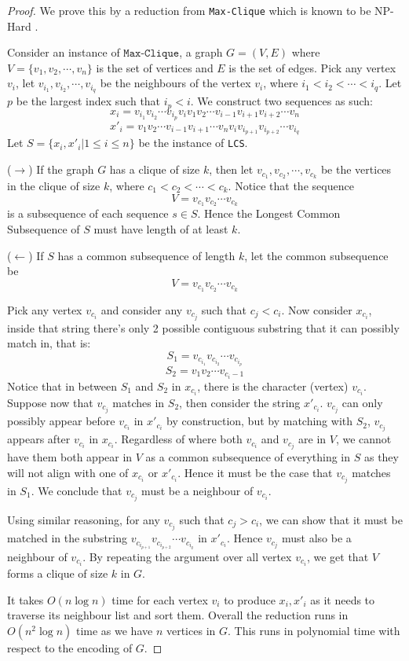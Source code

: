 \begin{proof}
    We prove this by a reduction from \texttt{Max-Clique} which is known to be NP-Hard \cite{MaxClique}.
    
    Consider an instance of $\texttt{Max-Clique}$, a graph $G = (V, E)$ where $V = \{v_1, v_2, \cdots, v_n\}$ is the set of vertices and $E$ is the set of edges. Pick any vertex $v_i$, let $v_{i_1}, v_{i_2}, \cdots, v_{i_q}$ be the neighbours of the vertex $v_i$, where $i_1 < i_2 < \cdots < i_q$. Let $p$ be the largest index such that $i_p < i$. We construct two sequences as such:
    \[x_i = v_{i_1}v_{i_2}\cdots v_{i_p} v_i v_1 v_2 \cdots v_{i - 1} v_{i + 1} v_{i + 2} \cdots v_n\]
    \[x'_i = v_1 v_2 \cdots v_{i - 1} v_{i + 1} \cdots v_n v_i v_{i_{p + 1}} v_{i_{p + 2}} \cdots v_{i_q}\]
    Let $S = \{x_i, x'_i | 1 \leq i \leq n\}$ be the instance of \texttt{LCS}.

    ($\rightarrow$)
    If the graph $G$ has a clique of size $k$, then let $v_{c_1}, v_{c_2}, \cdots, v_{c_k}$ be the vertices in the clique of size $k$, where $c_1 < c_2 < \cdots < c_k$. Notice that the sequence
    \[V = v_{c_1} v_{c_2} \cdots v_{c_k}\] 
    is a subsequence of each sequence $s \in S$. Hence the Longest Common Subsequence of $S$ must have length of at least $k$.

    ($\leftarrow$)
    If $S$ has a common subsequence of length $k$, let the common subsequence be 
    \[V = v_{c_1} v_{c_2} \cdots v_{c_k}\] 

    Pick any vertex $v_{c_i}$ and consider any $v_{c_j}$ such that $c_j < c_i$. Now consider $x_{c_i}$, inside that string there's only 2 possible contiguous substring that it can possibly match in, that is:
    \[S_1 = v_{c_{i_1}}v_{c_{i_2}}\cdots v_{c_{i_p}}\]
    \[S_2 = v_1 v_2 \cdots v_{c_i - 1}\]
    Notice that in between $S_1$ and $S_2$ in $x_{c_i}$, there is the character (vertex) $v_{c_i}$. Suppose now that $v_{c_j}$ matches in $S_2$, then consider the string $x'_{c_i}$. $v_{c_j}$ can only possibly appear before $v_{c_i}$ in $x'_{c_i}$ by construction, but by matching with $S_2$, $v_{c_j}$ appears after $v_{c_i}$ in $x_{c_i}$. Regardless of where both $v_{c_i}$ and $v_{c_j}$ are in $V$, we cannot have them both appear in $V$ as a common subsequence of everything in $S$ as they will not align with one of $x_{c_i}$ or $x'_{c_i}$. Hence it must be the case that $v_{c_j}$ matches in $S_1$. We conclude that $v_{c_j}$ must be a neighbour of $v_{c_i}$.

    Using similar reasoning, for any $v_{c_j}$ such that $c_j > c_i$, we can show that it must be matched in the substring $v_{c_{i_{p + 1}}} v_{c_{i_{p + 2}}} \cdots v_{c_{i_q}}$ in $x'_{c_i}$. Hence $v_{c_j}$ must also be a neighbour of $v_{c_i}$. By repeating the argument over all vertex $v_{c_i}$, we get that $V$ forms a clique of size $k$ in $G$.

    It takes $O(n \log n)$ time for each vertex $v_i$ to produce $x_i, x'_i$ as it needs to traverse its neighbour list and sort them. Overall the reduction runs in $O(n^2 \log n)$ time as we have $n$ vertices in $G$. This runs in polynomial time with respect to the encoding of $G$.
\end{proof}

